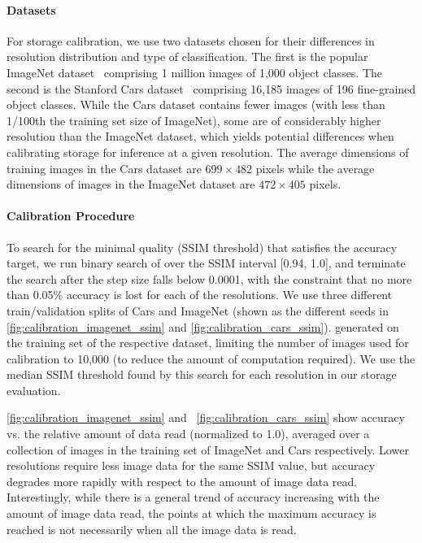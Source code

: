 \paragraph{Datasets}
For storage calibration, we use two datasets chosen for their differences in resolution distribution and type of classification.
The first is the popular ImageNet dataset~\cite{russakovsky2015imagenet} comprising 1 million images of 1,000 object classes.
The second is the Stanford Cars dataset~\cite{krause20133d} comprising 16,185 images of 196 fine-grained object classes.
While the Cars dataset contains fewer images (with less than 1/100th the training set size of ImageNet), some are of considerably higher resolution than the ImageNet dataset, which yields potential differences when calibrating storage for inference at a given resolution.
The average dimensions of training images in the Cars dataset are $699\times482$ pixels while the average dimensions of images in the ImageNet dataset are $472\times405$ pixels.
\paragraph{Calibration Procedure}
To search for the minimal quality (SSIM threshold) that satisfies the accuracy target, we run binary search of over the SSIM interval [0.94, 1.0], and terminate the search after the step size falls below 0.0001, with the constraint that no more than 0.05\% accuracy is lost for each of the resolutions.
We use three different train/validation splits of Cars and ImageNet (shown as the different seeds in \autoref{fig:calibration_imagenet_ssim} and \autoref{fig:calibration_cars_ssim}). generated on the training set of the respective dataset, limiting the number of images used for calibration to 10,000 (to reduce the amount of computation required).
We use the median SSIM threshold found by this search for each resolution in our storage evaluation.

\autoref{fig:calibration_imagenet_ssim} and~ \autoref{fig:calibration_cars_ssim} show accuracy vs. the relative amount of data read (normalized to 1.0), averaged over a collection of images in the training set of ImageNet and Cars respectively.
Lower resolutions require less image data for the same SSIM value, but accuracy degrades more rapidly with respect to the amount of image data read.
Interestingly, while there is a general trend of accuracy increasing with the amount of image data read, the points at which the maximum accuracy is reached is not necessarily when all the image data is read.


